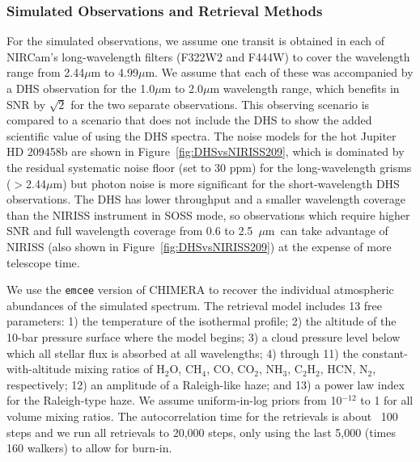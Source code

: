 \documentclass[iop]{emulateapj}
\newcommand{\SOSSrangeto}{0.6 to 2.5~$\mu$m}
\begin{document}
\subsubsection{Simulated Observations and Retrieval Methods}


For the simulated observations, we assume one transit is obtained in each of NIRCam's long-wavelength filters (F322W2 and F444W) to cover the wavelength range from 2.44$\mu$m to 4.99$\mu$m.
We assume that each of these was accompanied by a DHS observation for the 1.0$\mu$m to 2.0$\mu$m wavelength range, which benefits in SNR by $\sqrt{2}$ for the two separate observations.
This observing scenario is compared to a scenario that does not include the DHS to show the added scientific value of using the DHS spectra.
The noise models for the hot Jupiter HD 209458b are shown in Figure~\ref{fig:DHSvsNIRISS209}, which is dominated by the residual systematic noise floor (set to 30 ppm) for the long-wavelength grisms ($>$2.44$\mu$m) but photon noise is more significant for the short-wavelength DHS observations.
The DHS has lower throughput and a smaller wavelength coverage than the NIRISS instrument in SOSS mode, so observations which require higher SNR and full wavelength coverage from \SOSSrangeto\ can take advantage of NIRISS (also shown in Figure~\ref{fig:DHSvsNIRISS209}) at the expense of more telescope time.


We use the \texttt{emcee} version of CHIMERA \citep{greene2016jwst_trans} to recover the individual atmospheric abundances of the simulated spectrum. The retrieval model includes 13 free parameters: 1) the temperature of the isothermal profile; 2) the altitude of the 10-bar pressure surface where the model begins; 3) a cloud pressure level below which all stellar flux is absorbed at all wavelengths; 4) through 11) the constant-with-altitude mixing ratios of H$_2$O, CH$_4$, CO, CO$_2$, NH$_3$, C$_2$H$_2$, HCN, N$_2$, respectively; 12) an amplitude of a Raleigh-like haze; and 13) a power law index for the Raleigh-type haze. We assume uniform-in-log priors from 10$^{-12}$ to 1 for all volume mixing ratios. The autocorrelation time for the retrievals is about ~100 steps and we run all retrievals to 20,000 steps, only using the last 5,000 (times 160 walkers) to allow for burn-in.

\end{document}
